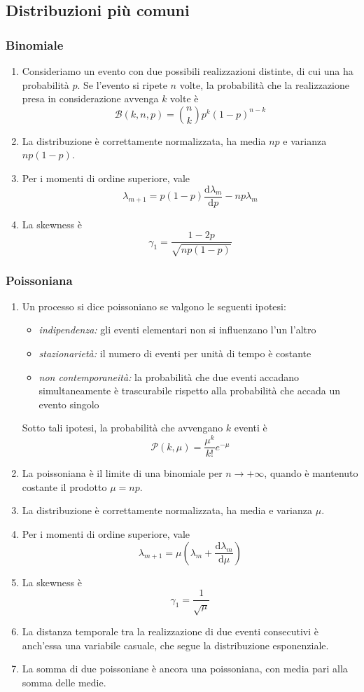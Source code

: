 \documentclass[a4paper,11pt]{article}
\begin{document}
\subsection{Distribuzioni più comuni}
\subsubsection{Binomiale}
\begin{enumerate}[resume]
	\item Consideriamo un evento con due possibili realizzazioni distinte, di cui una ha probabilità $p$. Se l'evento si ripete $n$ volte, la probabilità che la realizzazione presa in considerazione avvenga $k$ volte è 
	\[\mathcal{B}(k,n,p)=\binom{n}{k}p^k(1-p)^{n-k}\]
	\item La distribuzione è correttamente normalizzata, ha media $np$ e varianza $np(1-p)$.
	\item Per i momenti di ordine superiore, vale
	\[\lambda_{m+1}=p(1-p)\frac{\mathrm{d}\lambda_m}{\mathrm{d}p}-np\lambda_m\]
	\item La skewness è
	\[\gamma_1=\frac{1-2p}{\sqrt{np(1-p)}}\]
\end{enumerate}
\subsubsection{Poissoniana}
\begin{enumerate}[resume]
	\item Un processo si dice poissoniano se valgono le seguenti ipotesi:
	\begin{itemize}
		\item \textit{indipendenza:} gli eventi elementari non si influenzano l'un l'altro
		\item \textit{stazionarietà:} il numero di eventi per unità di tempo è costante
		\item \textit{non contemporaneità:} la probabilità che due eventi accadano simultaneamente è trascurabile rispetto alla probabilità che accada un evento singolo
	\end{itemize}
	Sotto tali ipotesi, la probabilità che avvengano $k$ eventi è
	\[\mathcal{P}(k,\mu)=\frac{\mu^k}{k!}e^{-\mu}\]
	\item La poissoniana è il limite di una binomiale per $n\to+\infty$, quando è mantenuto costante il prodotto $\mu=np$.
	\item La distribuzione è correttamente normalizzata, ha media e varianza $\mu$.
	\item Per i momenti di ordine superiore, vale
	\[\lambda_{m+1}=\mu\left(\lambda_m+\frac{\mathrm{d}\lambda_m}{\mathrm{d}\mu}\right)\]
	\item La skewness è
	\[\gamma_1=\frac{1}{\sqrt{\mu}}\]
	\item La distanza temporale tra la realizzazione di due eventi consecutivi è anch'essa una variabile casuale, che segue la distribuzione esponenziale.
	\item La somma di due poissoniane è ancora una poissoniana, con media pari alla somma delle medie.	
\end{enumerate}
\end{document}
